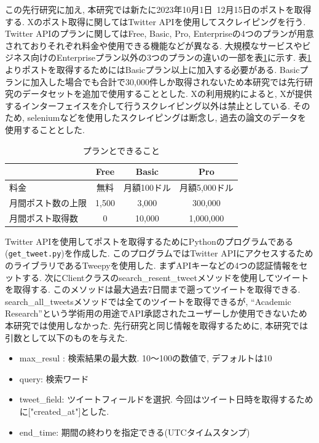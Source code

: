 この先行研究に加え, 本研究では新たに2023年10月1日~12月15日のポストを取得する. Xのポスト取得に関してはTwitter APIを使用してスクレイピングを行う. Twitter APIのプランに関してはFree, Basic, Pro, Enterpriseの4つのプランが用意されておりそれぞれ料金や使用できる機能などが異なる. 大規模なサービスやビジネス向けのEnterpriseプラン以外の3つのプランの違いの一部を表\ref{tb:xplan}に示す. 
表\ref{tb:xplan}よりポストを取得するためにはBasicプラン以上に加入する必要がある. Basicプランに加入した場合でも合計で30,000件しか取得されないため本研究では先行研究のデータセットを追加で使用することとした. Xの利用規約によると, Xが提供するインターフェイスを介して行うスクレイピング以外は禁止としている. そのため, seleniumなどを使用したスクレイピングは断念し, 過去の論文のデータを使用することとした. 


\begin{table}[htbp]
  \caption{プランとできること}
  \label{tb:xplan}
  \begin{center}
  \begin{tabular}{|l|c|c|c|}
    \hline
    &Free&Basic&Pro \\\hline\hline
    料金&無料&月額100ドル&月額5,000ドル \\\hline
    月間ポスト数の上限&1,500&3,000&300,000 \\\hline
    月間ポスト取得数&0&10,000&1,000,000 \\\hline
  \end{tabular}\end{center}
\end{table}

Twitter APIを使用してポストを取得するためにPythonのプログラムである(\verb|get_tweet.py|)を作成した. このプログラムではTwitter APIにアクセスするためのライブラリであるTweepy\cite{tweepy}を使用した. まずAPIキーなどの4つの認証情報をセットする. 次にClientクラスのsearch\_resent\_tweetメソッドを使用してツイートを取得する. 
このメソッドは最大過去7日間まで遡ってツイートを取得できる. search\_all\_tweetsメソッドでは全てのツイートを取得できるが, ``Academic Research''という学術用の用途でAPI承認されたユーザーしか使用できないため本研究では使用しなかった. 
先行研究と同じ情報を取得するために, 本研究では引数として以下のものを与えた. 
\begin{itemize}
 \item max\_resul : 検索結果の最大数. 10〜100の数値で, デフォルトは10
 \item query: 検索ワード
 \item tweet\_field: ツイートフィールドを選択. 今回はツイート日時を取得するために["created\_at"]とした. 
 \item end\_time: 期間の終わりを指定できる(UTCタイムスタンプ)
\end{itemize}

